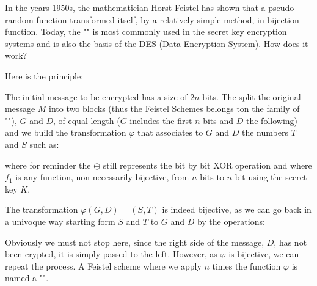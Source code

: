 	In the years 1950s, the mathematician Horst Feistel has shown that a pseudo-random function transformed itself, by a relatively simple method, in bijection function. Today, the "" is most commonly used in the secret key encryption systems and is also the basis of the DES (Data Encryption System). How does it work?
	
	Here is the principle:
	
	The initial message to be encrypted has a size of $2n$ bits. The split the original message $M$ into two blocks (thus the Feistel Schemes belongs ton the family of ""), $G$ and $D$, of equal length ($G$ includes the first $n$ bits and $D$ the following) and we build the transformation $\varphi$ that associates to $G$ and $D$ the numbers $T$ and $S$ such as:
	
	where for reminder the $\oplus$ still represents the bit by bit XOR operation and where $f_1$ is any function, non-necessarily bijective, from $n$ bits to $n$ bit using the secret key $K$.
	
	The transformation $\varphi(G,D)=(S,T)$ is indeed bijective, as we can go back in a univoque way starting form $S$ and $T$ to $G$ and $D$ by the operations:
	
	Obviously we must not stop here, since the right side of the message, $D$, has not been crypted, it is simply passed to the left. However, as $\varphi$ is bijective, we can repeat the process. A Feistel scheme where we apply $n$ times the function $\varphi$ is named a "".
	
